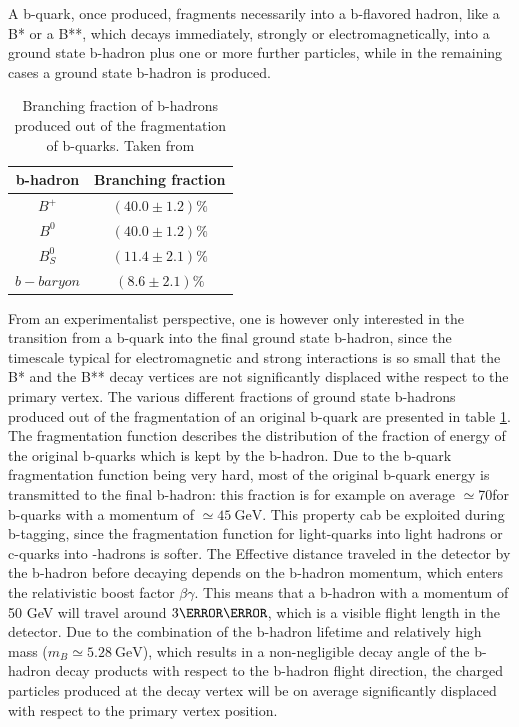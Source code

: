 A b-quark, once produced, fragments necessarily into a b-flavored hadron, like a B* or a B**, which decays immediately, strongly or electromagnetically, into a ground state b-hadron plus one or more further particles, while in the remaining cases a ground state b-hadron is produced.
\begin{table}
\begin{center}
\begin{tabular}{|c|c|}
\hline
b-hadron 	& Branching fraction \\
\hline
$B^+$			& $(40.0\pm1.2)\percent$ \\
$B^0$			& $(40.0\pm1.2)\percent$ \\
$B^0_S$			& $(11.4\pm2.1)\percent$ \\
$b-baryon$	& $(8.6\pm2.1)\percent$ \\
\hline
\end{tabular}
\caption{Branching fraction of b-hadrons produced out of the fragmentation of b-quarks. Taken from \cite{Giac_71}}
\label{tab:b_br}
\end{center}
\end{table}
From an experimentalist perspective, one is however only interested in the transition from a b-quark into the final ground state b-hadron, since the timescale typical for electromagnetic and strong interactions is so small that the B* and the B** decay vertices are not significantly displaced withe respect to the primary vertex. The various different fractions of ground state b-hadrons produced out of the fragmentation of an original b-quark are presented in table \ref{tab:b_br}.
The fragmentation function describes the distribution of the fraction of energy of the original b-quarks which is kept by the b-hadron. Due to the b-quark fragmentation function being very hard, most of the original b-quark energy is transmitted to the final b-hadron: this fraction is for example on average $\simeq$70\percent for b-quarks with a momentum of $\simeq \SI{45}{\GeV}$. This property cab be exploited during b-tagging, since the fragmentation function for light-quarks into light hadrons or c-quarks into -hadrons is softer.
The Effective distance traveled in the detector by the b-hadron before decaying depends on the b-hadron momentum, which enters the relativistic boost factor $\beta\gamma$. This means that a b-hadron with a momentum of 50 GeV will travel around $3\milli\meter$, which is a visible flight length in the detector. Due to the combination of the b-hadron lifetime and relatively high mass ($m_B\simeq\SI{5.28}{\GeV}$), which results in a non-negligible decay angle of the b-hadron decay products with respect to the b-hadron flight direction, the charged particles produced at the decay vertex will be on average significantly displaced with respect to the primary vertex position.\\
